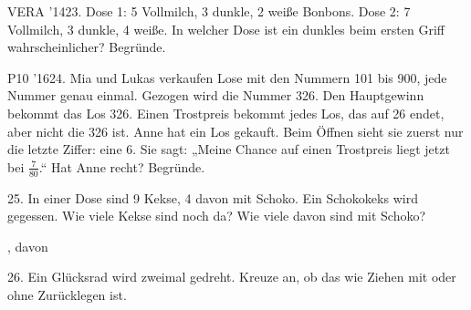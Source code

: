 \documentclass[11pt]{article}
\begin{document}
\pfgruppe{}
\begin{pfaufg}{VERA ’14}{23.}{}
Dose 1: 5 Vollmilch, 3 dunkle, 2 weiße Bonbons. Dose 2: 7 Vollmilch, 3 dunkle, 4 weiße. In welcher Dose ist ein dunkles beim ersten Griff wahrscheinlicher? Begründe.
\end{pfaufg}
\begin{pfaufg}{P10 ’16}{\llap{\textasteriskcentered\,}24.}{}
Mia und Lukas verkaufen Lose mit den Nummern 101 bis 900, jede Nummer genau einmal. Gezogen wird die Nummer 326. Den Hauptgewinn bekommt das Los 326. Einen Trostpreis bekommt jedes Los, das auf 26 endet, aber nicht die 326 ist. Anne hat ein Los gekauft. Beim Öffnen sieht sie zuerst nur die letzte Ziffer: eine 6. Sie sagt: „Meine Chance auf einen Trostpreis liegt jetzt bei $\tfrac{7}{80}$.“ Hat Anne recht? Begründe.
\par\smallskip\noindent {}\par
{}
\end{pfaufg}
\pfgruppe{}
\begin{pfaufg}{}{25.}{}
In einer Dose sind 9 Kekse, 4 davon mit Schoko. Ein Schokokeks wird gegessen. Wie viele Kekse sind noch da? Wie viele davon sind mit Schoko?
\par\noindent \leerfeld[insgesamt] , davon \leerfeld \par
{}
\end{pfaufg}
\begin{pfaufg}{}{26.}{}
Ein Glücksrad wird zweimal gedreht. Kreuze an, ob das wie Ziehen mit oder ohne Zurücklegen ist. 
\end{pfaufg}
\pfgruppe{}
\end{document}
